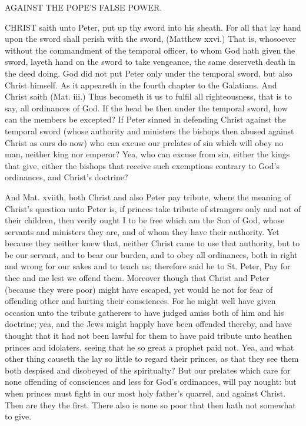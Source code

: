 AGAINST THE POPE'S FALSE POWER. 

CHRIST saith unto Peter, put up thy sword into his sheath. 
For all that lay hand upon the sword shall perish with 
the sword, (Matthew xxvi.) That is, whosoever without the 
commandment of the temporal officer, to whom God hath 
given the sword, layeth hand on the sword to take vengeance,
the same deserveth death in the deed doing. God did 
not put Peter only under the temporal sword, but also
Christ himself. As it appeareth in the fourth chapter to
the Galatians. And Christ saith (Mat. iii.) Thus becometh
it us to fulfil all righteousness, that is to say, all 
ordinances of God. If the head be then under the temporal
sword, how can the members be excepted? If 
Peter sinned in defending Christ against the temporal 
sword (whose authority and ministers the bishops then 
abused against Christ as ours do now) who can excuse our 
prelates of sin which will obey no man, neither king nor 
emperor? Yea, who can excuse from sin, either the kings 
that give, either the bishops that receive such exemptions 
contrary to God's ordinances, and Christ's doctrine? 

And Mat. xviith, both Christ and also Peter pay tribute, 
where the meaning of Christ's question unto Peter is, if 
princes take tribute of strangers only and not of their 
children, then verily ought I to be free which am the Son 
of God, whose servants and ministers they are, and of 
whom they have their authority. Yet because they neither 
knew that, neither Christ came to use that authority, but 
to be our servant, and to bear our burden, and to obey all 
ordinances, both in right and wrong for our sakes and to 
teach us; therefore said he to St. Peter, Pay for thee and 
me lest we offend them. Moreover though that Christ 
and Peter (because they were poor) might have escaped, 
yet would he not for fear of offending other and hurting 
their consciences. For he might well have given occasion 
unto the tribute gatherers to have judged amiss both of 
him and his doctrine; yea, and the Jews might happly 
have been offended thereby, and have thought that it had 
not been lawful for them to have paid tribute unto heathen 
princes and idolaters, seeing that he so great a prophet 
paid not. Yea, and what other thing causeth the lay 
so little to regard their princes, as that they see them both 
despised and disobeyed of the spiritualty? But our prelates
which care for none offending of consciences and less
for God's ordinances, will pay nought: but when princes
must fight in our most holy father's quarrel, and against
Christ. Then are they the first. There also is none so 
poor that then hath not somewhat to give.

